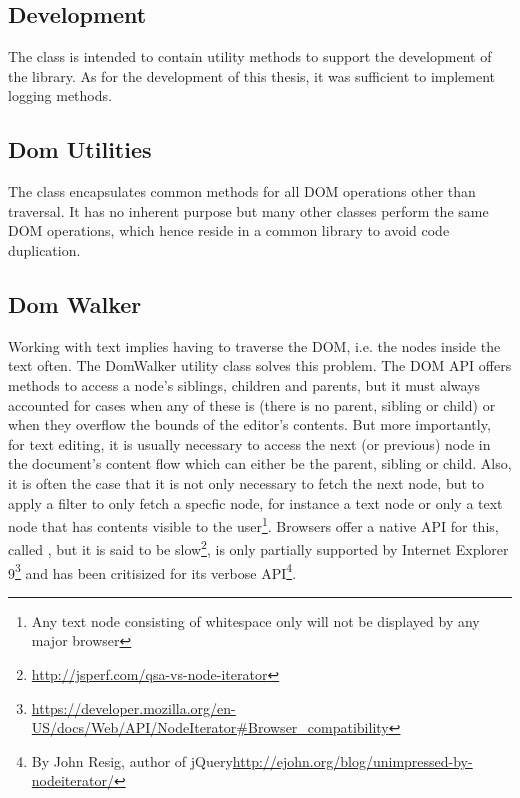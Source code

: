 



\subsection{Development}

The  class is intended to contain utility methods to support the development of the library. As for the development of this thesis, it was sufficient to implement logging methods.

\subsection{Dom Utilities}

The  class encapsulates common methods for all DOM operations other than traversal. It has no inherent purpose but many other classes perform the same DOM operations, which hence reside in a common library to avoid code duplication.

\subsection{Dom Walker}

Working with text implies having to traverse the DOM, i.e. the nodes inside the text often. The {DomWalker} utility class solves this problem. The DOM API offers methods to access a node's siblings, children and parents, but it must always accounted for cases when any of these is  (there is no parent, sibling or child) or when they overflow the bounds of the editor's contents. But more importantly, for text editing, it is usually necessary to access the next (or previous) node in the document's content flow which can either be the parent, sibling or child. Also, it is often the case that it is not only necessary to fetch the next node, but to apply a filter to only fetch a specfic node, for instance a text node or only a text node that has contents visible to the user\footnote{Any text node consisting of whitespace only will not be displayed by any major browser}. Browsers offer a native API for this, called , but it is said to be slow\footnote{\url{http://jsperf.com/qsa-vs-node-iterator}}, is only partially supported by Internet Explorer 9\footnote{\url{https://developer.mozilla.org/en-US/docs/Web/API/NodeIterator\#Browser_compatibility}} and has been critisized for its verbose API\footnote{By John Resig, author of jQuery\url{http://ejohn.org/blog/unimpressed-by-nodeiterator/}}.

